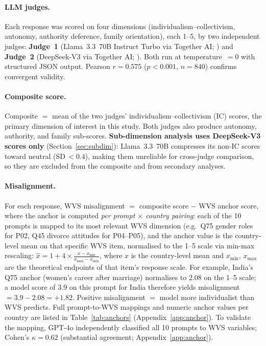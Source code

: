 \documentclass[11pt]{article}
\begin{document}
\paragraph{LLM judges.}
Each response was scored on four dimensions (individualism--collectivism,
autonomy, authority deference, family orientation), each 1--5, by two
independent judges: \textbf{Judge~1} (Llama~3.3~70B Instruct Turbo via
Together AI; \citealt{touvron-2023}) and \textbf{Judge~2} (DeepSeek-V3
via Together AI; \citealt{deepseek-2024}). Both run at temperature~$=0$ with
structured JSON output. Pearson $r = 0.575$ ($p < 0.001$, $n = 840$) confirms
convergent validity.

\paragraph{Composite score.}
Composite $=$ mean of the two judges' individualism--collectivism (IC) scores,
the primary dimension of interest in this study.
Both judges also produce autonomy, authority, and family sub-scores.
\textbf{Sub-dimension analysis uses DeepSeek-V3 scores only}
(Section~\ref{sec:subdim}): Llama~3.3~70B compresses its non-IC scores toward
neutral (SD\,$<0.4$), making them unreliable for cross-judge comparison, so
they are excluded from the composite and from secondary analyses.

\paragraph{Misalignment.}
For each response, WVS misalignment $= $ composite score $-$ WVS anchor score,
where the anchor is computed \emph{per prompt $\times$ country pairing}: each
of the 10 prompts is mapped to its most relevant WVS dimension (e.g.\ Q75
gender roles for P02, Q45 divorce attitudes for P04--P05), and the anchor value
is the country-level mean on that specific WVS item, normalised to the 1--5 scale
via min-max rescaling: $\hat{x} = 1 + 4 \times \frac{x - x_{\min}}{x_{\max} - x_{\min}}$,
where $x$ is the country-level mean and $x_{\min}$, $x_{\max}$ are the theoretical
endpoints of that item's response scale.
For example, India's Q75 anchor (women's career after marriage) normalises to
2.08 on the 1--5 scale; a model score of 3.9 on this prompt for India therefore
yields misalignment $= 3.9 - 2.08 = +1.82$.
Positive misalignment $=$ model more individualist than WVS predicts.
Full prompt-to-WVS mappings and numeric anchor values per country are listed in
Table~\ref{tab:anchors} (Appendix~\ref{app:anchor}).
To validate the mapping, GPT-4o independently classified all 10 prompts to WVS variables;
Cohen's $\kappa = 0.62$ (substantial agreement; Appendix~\ref{app:anchor}).
\end{document}
